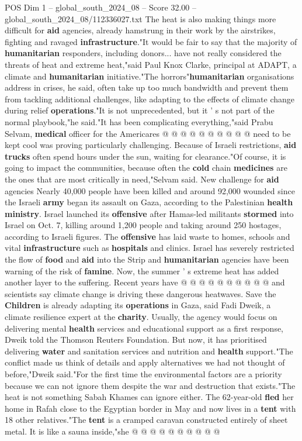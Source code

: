 \begin{textsample}{POS Dim 1 – global\_south\_2024\_08 – Score 32.00 – global\_south\_2024\_08/112336027.txt}
The heat is also making things more difficult for \textbf{aid} agencies, already hamstrung in their work by the airstrikes, fighting and ravaged \textbf{infrastructure}."It would be fair to say that the majority of \textbf{humanitarian} responders, including donors... have not really considered the threats of heat and extreme heat,"said Paul Knox Clarke, principal at ADAPT, a climate and \textbf{humanitarian} initiative."The horrors"\textbf{humanitarian} organisations address in crises, he said, often take up too much bandwidth and prevent them from tackling additional challenges, like adapting to the effects of climate change during relief \textbf{operations}."It is not unprecedented, but it ' s not part of the normal playbook,"he said."It has been complicating everything,"said Prabu Selvam, \textbf{medical} officer for the Americares @ @ @ @ @ @ @ @ @ @ need to be kept cool was proving particularly challenging.
Because of Israeli restrictions, \textbf{aid} \textbf{trucks} often spend hours under the sun, waiting for clearance."Of course, it is going to impact the communities, because often the \textbf{cold} chain \textbf{medicines} are the ones that are most critically in need,"Selvam said.
New challenge for \textbf{aid} agencies Nearly 40,000 people have been killed and around 92,000 wounded since the Israeli \textbf{army} began its assault on Gaza, according to the Palestinian \textbf{health} \textbf{ministry}.
Israel launched its \textbf{offensive} after Hamas-led militants \textbf{stormed} into Israel on Oct. 7, killing around 1,200 people and taking around 250 hostages, according to Israeli figures.
The \textbf{offensive} has laid waste to homes, schools and vital \textbf{infrastructure} such as \textbf{hospitals} and clinics.
Israel has severely restricted the flow of \textbf{food} and \textbf{aid} into the Strip and \textbf{humanitarian} agencies have been warning of the risk of \textbf{famine}.
Now, the summer ' s extreme heat has added another layer to the suffering.
Recent years have @ @ @ @ @ @ @ @ @ @ and scientists say climate change is driving these dangerous heatwaves.
Save the \textbf{Children} is already adapting its \textbf{operations} in Gaza, said Fadi Dweik, a climate resilience expert at the \textbf{charity}.
Usually, the agency would focus on delivering mental \textbf{health} services and educational support as a first response, Dweik told the Thomson Reuters Foundation.
But now, it has prioritised delivering \textbf{water} and sanitation services and nutrition and \textbf{health} support."The conflict made us think of details and apply alternatives we had not thought of before,"Dweik said."For the first time the environmental factors are a priority because we can not ignore them despite the war and destruction that exists."The heat is not something Sabah Khames can ignore either.
The 62-year-old \textbf{fled} her home in Rafah close to the Egyptian border in May and now lives in a \textbf{tent} with 18 other relatives."The \textbf{tent} is a cramped caravan constructed entirely of sheet metal.
It is like a sauna inside,"she @ @ @ @ @ @ @ @ @ @


\end{textsample}
